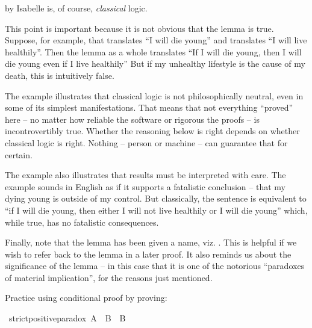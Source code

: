 \begin{isabellebody}
\begin{isamarkuptext}
by Isabelle is, of course, \emph{classical} logic.%
\end{isamarkuptext}\isamarkuptrue%
%
\begin{isamarkuptext}%
This point is important because it is not obvious that the lemma is true. Suppose, for example,
that  translates ``I will die young'' and  translates ``I will live healthily''. 
Then the lemma as a whole translates ``If I will die young, then I will die young even if I live
healthily'' But if my unhealthy lifestyle is the cause of my death, this is intuitively false.%
\end{isamarkuptext}\isamarkuptrue%
%
\begin{isamarkuptext}%
The example illustrates that classical logic is not philosophically neutral, even in some of its 
simplest manifestations. That means that not everything ``proved'' here -- no matter how reliable
the software or rigorous the proofs -- is incontrovertibly true. Whether the reasoning below is right
depends on whether classical logic is right. Nothing -- person or machine -- can guarantee that for
certain.%
\end{isamarkuptext}\isamarkuptrue%
%
\begin{isamarkuptext}%
The example also illustrates that results must be interpreted with care. The example sounds
in English as if it supports a fatalistic conclusion -- that my dying young is outside of my control.
But classically, the sentence is equivalent to ``if I will die young, then either I will not live
healthily or I will die young'' which, while true, has no fatalistic consequences.%
\end{isamarkuptext}\isamarkuptrue%
%
\begin{isamarkuptext}%
Finally, note that the lemma has been given a name, viz. . This is
helpful if we wish to refer back to the lemma in a later proof. It also reminds us about the significance
of the lemma -- in this case that it is one of the notorious ``paradoxes of material implication'',
for the reasons just mentioned.%
\end{isamarkuptext}\isamarkuptrue%
%
\begin{isamarkuptext}%
\begin{Exercise}[title={The Strict Positive Paradox}]
Practice using conditional proof by proving: \end{Exercise}%
\end{isamarkuptext}\isamarkuptrue%
\isamarkupfalse%
\ strict{\isacharunderscore}positive{\isacharunderscore}paradox{\isacharcolon}\ {\isachardoublequoteopen}A\ {\isasymlongrightarrow}\ B\ {\isasymlongrightarrow}\ B{\isachardoublequoteclose}%

\end{isabellebody}
